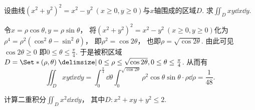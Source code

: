 \begin{example}
设曲线\((x^2+y^2)^2=x^2-y^2\ (x\geq0,y\geq0)\)与\(x\)轴围成的区域\(D\).
求\(\iint_D x y \dd{x}\dd{y}\).
\begin{solution}
令\(x=\rho\cos\theta,y=\rho\sin\theta\)，
将\((x^2+y^2)^2=x^2-y^2\ (x\geq0,y\geq0)\)化为
\(\rho^4=\rho^2(\cos^2\theta-\sin^2\theta)\)，
即\(\rho^2=\cos2\theta\)，
也即\(\rho=\sqrt{\cos2\theta}\).
由此可见\(\cos2\theta\geq0\)
即\(0\leq\theta\leq\frac\pi4\).
于是被积区域\(D = \Set*{ (\rho,\theta) \given 0\leq\rho\leq\sqrt{\cos2\theta}, 0\leq\theta\leq\frac\pi4 }\).
从而有\begin{equation*}
	\iint_D x y \dd{x}\dd{y}
	= \int_0^{\frac\pi4} \dd{\theta}
	\int_0^{\sqrt{\cos2\theta}} \rho^2 \cos\theta \sin\theta \cdot \rho \dd{\rho}
	= \frac1{48}.
\end{equation*}
\end{solution}
\end{example}

\begin{example}
计算二重积分\(\iint_D x^2 \dd{x}\dd{y}\)，
其中\(D: x^2+xy+y^2\leq2\).
\end{example}
